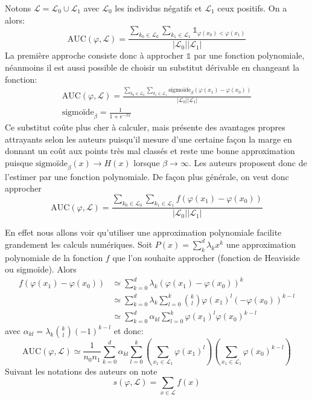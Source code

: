 Notons $\mathcal{L} = \mathcal{L_0} \cup \mathcal{L_1}$ avec $\mathcal{L_0}$ les individus négatifs et $\mathcal{L_1}$ ceux positifs. On a alors:
\begin{equation*}
    \mathrm{AUC} ( \varphi , \mathcal{L} ) = \frac{\sum_{k_0 \in \mathcal{L_0}} \sum_{k_1 \in \mathcal{L_1}} \mathds{1}_{\varphi(x_0) < \varphi(x_1)} }{\vert \mathcal{L}_0 \vert \vert \mathcal{L}_1 \vert }
\end{equation*}
La première approche consiste donc à approcher $\mathds{1}$ par une fonction polynomiale, néanmoins il est aussi possible de choisir un substitut dérivable en changeant la fonction:
\begin{gather*}
    \mathrm{AUC} ( \varphi , \mathcal{L} ) = \frac{\sum_{k_0 \in \mathcal{L_0}} \sum_{k_1 \in \mathcal{L_1}} \text{sigmoïde}_\beta \left( \varphi(x_1) - \varphi(x_0) \right) }{\vert \mathcal{L}_0 \vert \vert \mathcal{L}_1 \vert } \\
    \text{sigmoïde}_\beta = \frac{1}{1+e^{-\beta x}}
\end{gather*}
Ce substitut coûte plus cher à calculer, mais présente des avantages propres attrayants selon les auteurs puisqu'il mesure d'une certaine façon la marge en donnant un coût aux points très mal classés et reste une bonne approximation puisque $\text{sigmoïde}_\beta (x) \to H(x) $ lorsque $\beta \to \infty$. Les auteurs proposent donc de l'estimer par une fonction polynomiale.
De façon plus générale, on veut donc approcher
\begin{equation*}
    \mathrm{AUC} ( \varphi , \mathcal{L} ) = \frac{\sum_{k_0 \in \mathcal{L_0}} \sum_{k_1 \in \mathcal{L_1}} f \left( \varphi(x_1) - \varphi(x_0) \right) }{\vert \mathcal{L}_0 \vert \vert \mathcal{L}_1 \vert }
\end{equation*}

En effet nous allons voir qu'utiliser une approximation polynomiale facilite grandement les calculs numériques. Soit $P (x) = \sum_{k}^d \lambda_k x^k$ une approximation polynomiale de la fonction $f$ que l'on souhaite approcher (fonction de Heaviside ou sigmoïde). Alors
\begin{align*}
    f\left( \varphi(x_1) - \varphi(x_0)\right) &\simeq \sum_{k=0}^d \lambda_k \left( \varphi(x_1) - \varphi(x_0)\right)^k \\
    &\simeq \sum_{k=0}^d \lambda_k \sum_{l=0}^k \binom{k}{l} \varphi(x_1)^l (- \varphi(x_0) )^{k-l} \\
    &\simeq \sum_{k=0}^d \alpha_{kl} \sum_{l=0}^k \varphi(x_1)^l \varphi(x_0)^{k-l}
\end{align*}
avec $\alpha_{kl} = \lambda_k \binom{k}{l} (-1)^{k-l} $ et donc:
\begin{equation*}
    \mathrm{AUC} ( \varphi , \mathcal{L} ) \simeq \frac{1}{n_0 n_1} \sum_{k=0}^d \alpha_{kl} \sum_{l=0}^k \left( \sum_{x_1 \in \mathcal{L}_1} \varphi(x_1)^l \right) \left( \sum_{x_1 \in \mathcal{L}_1} \varphi(x_0)^{k-l} \right)
\end{equation*}
Suivant les notations des auteurs on note
\begin{equation*}
    s(\varphi, \mathcal{L}) = \sum_{x \in \mathcal{L}} f(x)
\end{equation*}

